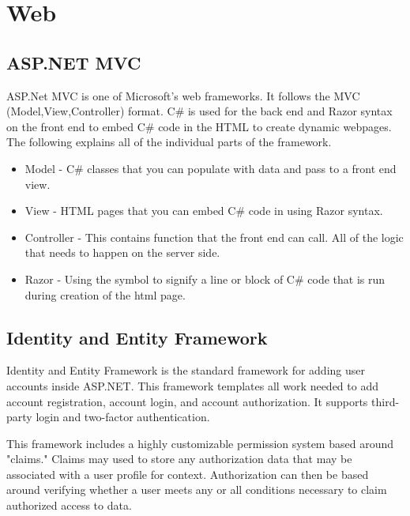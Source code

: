 
\section{Web}

\subsection{ASP.NET MVC}
ASP.Net MVC is one of Microsoft's web frameworks. It follows the MVC (Model,View,Controller) format.
C\# is used for the back end and Razor syntax on the front end to embed C\# code in the HTML to create dynamic webpages.
The following explains all of the individual parts of the framework.

\begin{itemize}
    \item Model - C\# classes that you can populate with data and pass to a front end view.
    \item View - HTML pages that you can embed C\# code in using Razor syntax.
    \item Controller - This contains function that the front end can call. All of the logic that needs to happen on the server side.
    \item Razor - Using the \@ symbol to signify a line or block of C\# code that is run during creation of the html page.
\end{itemize}
\subsection{Identity and Entity Framework}
Identity and Entity Framework is the standard framework for adding user accounts inside ASP.NET. This framework templates all work needed to add account registration, account login, and account authorization. It supports third-party login and two-factor authentication. 

This framework includes a highly customizable permission system based around "claims." Claims may used to store any authorization data that may be associated with a user profile for context. Authorization can then be based around verifying whether a user meets any or all conditions necessary to claim authorized access to data. 


